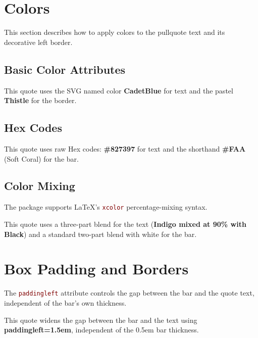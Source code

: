 \documentclass[12pt, a4paper]{article}
\let\oldtexttt\texttt
\renewcommand{\texttt}[1]{\textcolor{Maroon}{\oldtexttt{#1}}}
\begin{document}
\section*{Colors}

This section describes how to apply colors to the pullquote text and its decorative left border.

\subsection*{Basic Color Attributes}

\begin{pullquote}[color=CadetBlue, barcolor=Thistle]
This quote uses the SVG named color \textbf{CadetBlue} for text and the pastel \textbf{Thistle} for the border.
\end{pullquote}

\subsection*{Hex Codes}

\begin{pullquote}[color=pqHexText, barcolor=pqHexBar]
This quote uses raw Hex codes: \textbf{\#827397} for text and the shorthand \textbf{\#FAA} (Soft Coral) for the bar.
\end{pullquote}

\subsection*{Color Mixing}

The package supports LaTeX's \texttt{xcolor} percentage-mixing syntax.

\begin{pullquote}[color=Indigo!90!Black, barcolor=Indigo!20]
This quote uses a three-part blend for the text (\textbf{Indigo mixed at 90\% with Black}) and a standard two-part blend with white for the bar.
\end{pullquote}

\section*{Box Padding and Borders}

The \texttt{paddingleft} attribute controls the gap between the bar and the quote text, independent of the bar's own thickness.

\begin{pullquote}[barwidth=0.5em, paddingleft=1.5em]
This quote widens the gap between the bar and the text using \textbf{paddingleft=1.5em}, independent of the 0.5em bar thickness.
\end{pullquote}
\end{document}
